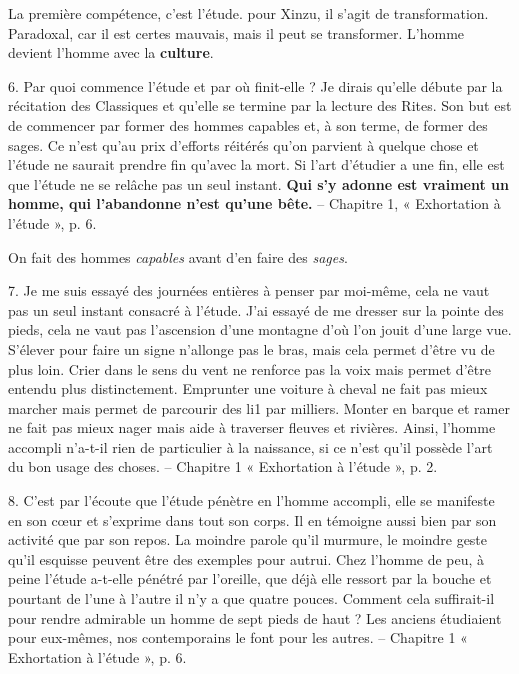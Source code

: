 La première compétence, c'est l'étude. pour Xinzu, il s'agit de transformation. Paradoxal, car il est certes mauvais, mais il peut se transformer. L'homme devient l'homme avec la \textbf{culture}.

\begin{singlequote}
    6.	Par quoi commence l’étude et par où finit-elle ? Je dirais qu’elle débute par la récitation des Classiques et qu’elle se termine par la lecture des Rites. Son but est de commencer par former des hommes capables et, à son terme, de former des sages. Ce n’est qu’au prix d’efforts réitérés qu’on parvient à quelque chose et l’étude ne saurait prendre fin qu’avec la mort. Si l’art d’étudier a une fin, elle est que l’étude ne se relâche pas un seul instant. \textbf{Qui s’y adonne est vraiment un homme, qui l’abandonne n’est qu’une bête.}
-- Chapitre 1, « Exhortation à l’étude », p. 6.
\end{singlequote}

On fait des hommes \textit{capables} avant d'en faire des \textit{sages}.


\begin{singlequote}
    7.	Je me suis essayé des journées entières à penser par moi-même, cela ne vaut pas un seul instant consacré à l’étude. J’ai essayé de me dresser sur la pointe des pieds, cela ne vaut pas l’ascension d’une montagne d’où l’on jouit d’une large vue. S’élever pour faire un signe n’allonge pas le bras, mais cela permet d’être vu de plus loin. Crier dans le sens du vent ne renforce pas la voix mais permet d’être entendu plus distinctement. Emprunter une voiture à cheval ne fait pas mieux marcher mais permet de parcourir des li1 par milliers. Monter en barque et ramer ne fait pas
 mieux nager mais aide à traverser fleuves et rivières. Ainsi, l’homme accompli n’a-t-il rien de particulier à la naissance, si ce n’est qu’il possède l’art du bon usage des choses.
-- Chapitre 1 « Exhortation à l’étude », p. 2.
\end{singlequote}



\begin{singlequote}
    8.	C’est par l’écoute que l’étude pénètre en l’homme accompli, elle se manifeste en son cœur et s’exprime dans tout son corps. Il en témoigne aussi bien par son activité que par son repos. La moindre parole qu’il murmure, le moindre geste qu’il esquisse peuvent être des exemples pour autrui. Chez l’homme de peu, à peine l’étude a-t-elle pénétré par l’oreille, que déjà elle ressort par la bouche et pourtant de l’une à l’autre il n’y a que quatre pouces. Comment cela suffirait-il pour rendre admirable un homme de sept pieds de haut ? Les anciens étudiaient pour eux-mêmes, nos contemporains le font pour les autres.
-- Chapitre 1 « Exhortation à l’étude », p. 6.
\end{singlequote}



